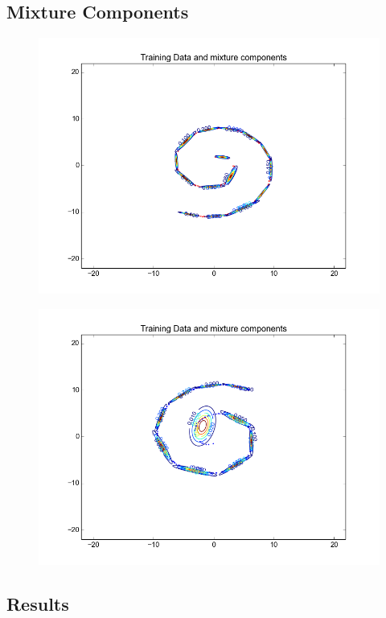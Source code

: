 \documentclass[11pt,a4paper]{article}
\begin{document}
\subsection{Mixture Components}
\begin{minipage}[b]{0.25\textwidth}
\begin{figure}[H]
  \centering
  \includegraphics[width=.8\linewidth]{Figures/contours_spiral05.png}
  \label{fig:sfig1}
\end{figure}%
\end{minipage}
\begin{minipage}[b]{0.25\textwidth}
\begin{figure}[H]
  \centering
  \includegraphics[width=.8\linewidth]{Figures/contours_spiral15.png}

  \label{fig:sfig1}
\end{figure}%
\end{minipage}
\subsection{Results}
\end{document}
